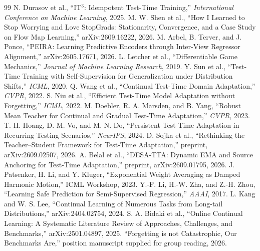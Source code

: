 \documentclass[11pt,a4paper]{article}
\begin{document}
\begin{thebibliography}{99}\small\setlength{\itemsep}{2pt}
 N. Durasov et al., ``IT$^3$: Idempotent Test-Time Training,'' \emph{International Conference on Machine Learning}, 2025.
 M. W. Shen et al., ``How I Learned to Stop Worrying and Love StopGrads: Stationarity, Convergence, and a Case Study on Flow Map Learning,'' arXiv:2609.16222, 2026.
 M. Arbel, B. Terver, and J. Ponce, ``PEIRA: Learning Predictive Encoders through Inter-View Regressor Alignment,'' arXiv:2605.17671, 2026.
 L. Letcher et al., ``Differentiable Game Mechanics,'' \emph{Journal of Machine Learning Research}, 2019.
 Y. Sun et al., ``Test-Time Training with Self-Supervision for Generalization under Distribution Shifts,'' \emph{ICML}, 2020.
 Q. Wang et al., ``Continual Test-Time Domain Adaptation,'' \emph{CVPR}, 2022.
 S. Niu et al., ``Efficient Test-Time Model Adaptation without Forgetting,'' \emph{ICML}, 2022.
 M. Doebler, R. A. Marsden, and B. Yang, ``Robust Mean Teacher for Continual and Gradual Test-Time Adaptation,'' \emph{CVPR}, 2023.
 T.-H. Hoang, D. M. Vo, and M. N. Do, ``Persistent Test-Time Adaptation in Recurring Testing Scenarios,'' \emph{NeurIPS}, 2024.
 D. Sojka et al., ``Rethinking the Teacher--Student Framework for Test-Time Adaptation,'' preprint, arXiv:2609.02507, 2026.
 A. Belal et al., ``DESA-TTA: Dynamic EMA and Source Anchoring for Test-Time Adaptation,'' preprint, arXiv:2609.01795, 2026.
 J. Patsenker, H. Li, and Y. Kluger, ``Exponential Weight Averaging as Damped Harmonic Motion,'' ICML Workshop, 2023.
 Y.-F. Li, H.-W. Zha, and Z.-H. Zhou, ``Learning Safe Prediction for Semi-Supervised Regression,'' \emph{AAAI}, 2017.
 L. Kang and W. S. Lee, ``Continual Learning of Numerous Tasks from Long-tail Distributions,'' arXiv:2404.02754, 2024.
 S. A. Bidaki et al., ``Online Continual Learning: A Systematic Literature Review of Approaches, Challenges, and Benchmarks,'' arXiv:2501.04897, 2025.
 ``Forgetting is not Catastrophic, Our Benchmarks Are,'' position manuscript supplied for group reading, 2026.
\end{thebibliography}
\end{document}
